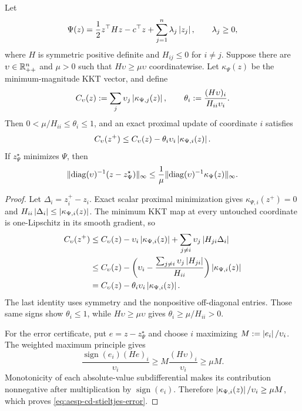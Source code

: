 \begin{theorem}
\label{thm:aesp-cd-stieltjes}
Let
\begin{equation*}
 \Psi(z)=\frac12 z^\top Hz-c^\top z
          +\sum_{j=1}^n\lambda_j\left\lvert z_j \right\rvert,
 \qquad \lambda_j\geq0,
\end{equation*}
where $H$ is symmetric positive definite and $H_{ij}\leq0$ for $i\neq j$.
Suppose there are $\upsilon\in\mathbb{R}_{++}^n$ and $\mu>0$ such that
$H\upsilon\geq\mu\upsilon$ coordinatewise.  Let $\kappa_\Psi(z)$ be the
minimum-magnitude KKT vector, and define
\begin{equation*}
 C_\upsilon(z):=\sum_j\upsilon_j\left\lvert \kappa_{\Psi,j}(z) \right\rvert,
 \qquad
 \theta_i:=\frac{(H\upsilon)_i}{H_{ii}\upsilon_i}.
\end{equation*}
Then $0<\mu/H_{ii}\leq\theta_i\leq1$, and an exact proximal update of
coordinate $i$ satisfies
\begin{equation}
 C_\upsilon(z^+)
 \leq C_\upsilon(z)
       -\theta_i\upsilon_i\left\lvert \kappa_{\Psi,i}(z) \right\rvert.
 \label{eq:aesp-cd-stieltjes-mass}
\end{equation}
If $z_\Psi^\star$ minimizes $\Psi$, then
\begin{equation}
 \lVert\operatorname{diag}(\upsilon)^{-1}
             (z-z_\Psi^\star)\rVert_\infty
 \leq\frac1\mu
 \lVert\operatorname{diag}(\upsilon)^{-1}
             \kappa_\Psi(z)\rVert_\infty.
 \label{eq:aesp-cd-stieltjes-error}
\end{equation}
\end{theorem}

\begin{proof}
Let $\Delta_i=z_i^+-z_i$.  Exact scalar proximal minimization gives
$\kappa_{\Psi,i}(z^+)=0$ and
$H_{ii}\left\lvert \Delta_i \right\rvert\leq\left\lvert \kappa_{\Psi,i}(z) \right\rvert$.  The minimum KKT map
at every untouched coordinate is one-Lipschitz in its smooth gradient, so
\begin{align*}
 C_\upsilon(z^+)
 &\leq C_\upsilon(z)-\upsilon_i\left\lvert \kappa_{\Psi,i}(z) \right\rvert
       +\sum_{j\neq i}\upsilon_j\left\lvert H_{ji}\Delta_i \right\rvert\\
 &\leq C_\upsilon(z)
       -\left(\upsilon_i
         -\frac{\sum_{j\neq i}\upsilon_j\left\lvert H_{ji} \right\rvert}{H_{ii}}\right)
        \left\lvert \kappa_{\Psi,i}(z) \right\rvert\\
 &=C_\upsilon(z)-\theta_i\upsilon_i
        \left\lvert \kappa_{\Psi,i}(z) \right\rvert.
\end{align*}
The last identity uses symmetry and the nonpositive off-diagonal entries.
Those same signs show $\theta_i\leq1$, while
$H\upsilon\geq\mu\upsilon$ gives
$\theta_i\geq\mu/H_{ii}>0$.

For the error certificate, put $e=z-z_\Psi^\star$ and choose $i$ maximizing
$M:=\left\lvert e_i \right\rvert/\upsilon_i$.  The weighted maximum principle gives
\begin{equation*}
 \frac{\operatorname{sign}(e_i)(He)_i}{\upsilon_i}
 \geq M\frac{(H\upsilon)_i}{\upsilon_i}\geq\mu M.
\end{equation*}
Monotonicity of each absolute-value subdifferential makes its contribution
nonnegative after multiplication by $\operatorname{sign}(e_i)$.  Therefore
$\left\lvert \kappa_{\Psi,i}(z) \right\rvert/\upsilon_i\geq\mu M$, which proves
\cref{eq:aesp-cd-stieltjes-error}.
\end{proof}

